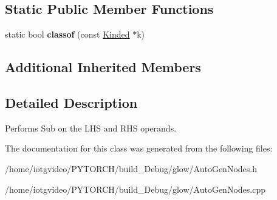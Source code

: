 \subsection*{Static Public Member Functions}
\begin{DoxyCompactItemize}
\item 
\mbox{\label{classglow_1_1_sub_node_a7364106e72b6f0d3223e592a87fee5be}} 
static bool {\bfseries classof} (const \hyperlink{classglow_1_1_kinded}{Kinded} $\ast$k)
\end{DoxyCompactItemize}
\subsection*{Additional Inherited Members}


\subsection{Detailed Description}
Performs Sub on the L\+HS and R\+HS operands. 

The documentation for this class was generated from the following files\+:\begin{DoxyCompactItemize}
\item 
/home/iotgvideo/\+P\+Y\+T\+O\+R\+C\+H/build\+\_\+\+Debug/glow/Auto\+Gen\+Nodes.\+h\item 
/home/iotgvideo/\+P\+Y\+T\+O\+R\+C\+H/build\+\_\+\+Debug/glow/Auto\+Gen\+Nodes.\+cpp\end{DoxyCompactItemize}
